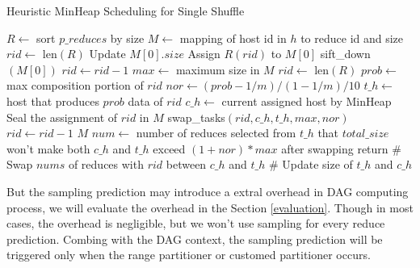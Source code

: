 \documentclass[10pt,twocolumn]{article}
\begin{document}
\begin{minipage}{\linewidth}
\begin{algorithm}[H]
\caption{Heuristic MinHeap Scheduling for Single Shuffle}
\label{hminheap}
	\begin{algorithmic}[1]
	\small
		\State $R\gets$ sort $p\_reduces$ by size
		\State $M\gets$ mapping of host id in $h$ to reduce id and size
		\State $rid\gets$ len$\left(R\right)$
		\State Update $M\left[0\right].size$
		\State Assign $R\left(rid\right)$ to $M\left[0\right]$
		\State sift\_down$\left(M\left[0\right]\right)$
		\State
		\State $rid\gets rid-1$
		\EndWhile
		\State $max\gets$ maximum size in $M$
		\State $rid\gets$ len$\left(R\right)$
		\State $prob\gets$ max composition portion of $rid$
		\State $nor\gets \left(prob-1/m\right)/\left(1-1/m\right)/10$
		\State
		\State $t\_h\gets$ host that produces $prob$ data of $rid$
		\State $c\_h\gets$ current assigned host by MinHeap
			\State Seal the assignment of $rid$ in $M$
		\Else
			\State swap\_tasks$\left(rid, c\_h, t\_h, max, nor\right)$
		\EndIf
		\State $rid\gets rid-1$
		\EndWhile
		\Return $M$
	\EndProcedure
	\State $num\gets$ number of reduces 
	\State selected from $t\_h$ that $total\_size$ won't
	\State make both $c\_h$ and $t\_h$ exceed $\left(1+nor\right)*max$
	\State after swapping
		\State return
	\Else
		\State \# Swap $nums$ of reduces with $rid$ between $c\_h$ and $t\_h$
		\State \# Update size of $t\_h$ and $c\_h$
	\EndIf
	\EndProcedure
	\end{algorithmic}
\end{algorithm}
\end{minipage}

But the sampling prediction may introduce a extral overhead in DAG computing process, we will evaluate the overhead in the Section \ref{evaluation}. Though in most cases, the overhead is negligible, but we won't use sampling for every reduce prediction. Combing with the DAG context, the sampling prediction will be triggered only when the range partitioner or customed partitioner occurs.
\end{document}
